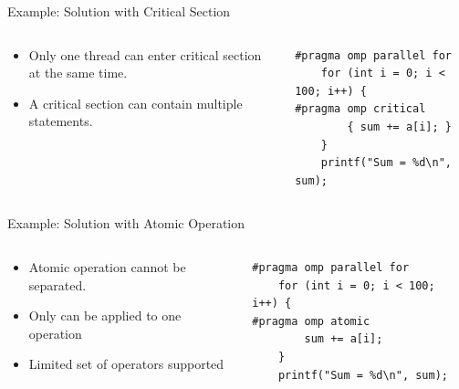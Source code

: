 \begin{frame}[fragile]{Example: Solution with Critical Section}
\begin{columns}[T]
    \begin{column}{0.5\textwidth}
        \begin{itemize}
            \item Only one thread can enter critical section at the same time.
            \item A critical section can contain multiple statements.
        \end{itemize}
    \end{column}
    \begin{column}{0.5\textwidth}
\begin{verbatim}
#pragma omp parallel for
    for (int i = 0; i < 100; i++) {
#pragma omp critical
        { sum += a[i]; }
    }
    printf("Sum = %d\n", sum);
\end{verbatim}
    \end{column}
\end{columns}

\end{frame}

\begin{frame}[fragile]{Example: Solution with Atomic Operation}
\begin{columns}[T]
    \begin{column}{0.5\textwidth}
        \begin{itemize}
            \item Atomic operation cannot be separated.
            \item Only can be applied to one operation
            \item Limited set of operators supported
        \end{itemize}
    \end{column}
    \begin{column}{0.5\textwidth}
\begin{verbatim}
#pragma omp parallel for
    for (int i = 0; i < 100; i++) {
#pragma omp atomic
        sum += a[i];
    }
    printf("Sum = %d\n", sum);
\end{verbatim}
    \end{column}
\end{columns}
\end{frame}

